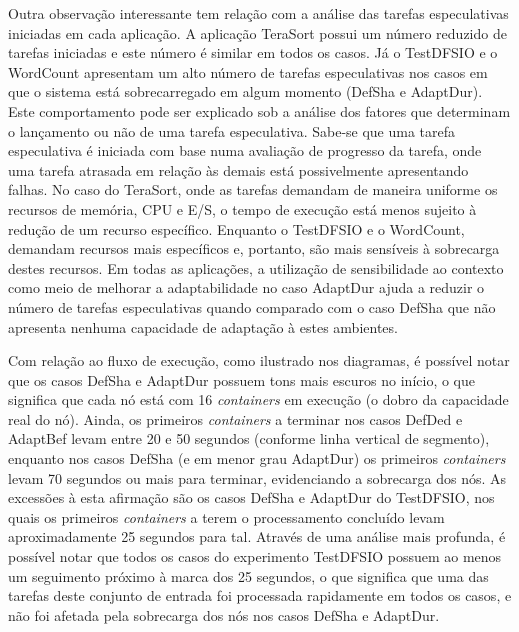 Outra observação interessante tem relação com a análise das tarefas especulativas iniciadas em cada aplicação. A aplicação TeraSort possui um número reduzido de tarefas iniciadas e este número é similar em todos os casos. Já o TestDFSIO e o WordCount apresentam um alto número de tarefas especulativas nos casos em que o sistema está sobrecarregado em algum momento (DefSha e AdaptDur). Este comportamento pode ser explicado sob a análise dos fatores que determinam o lançamento ou não de uma tarefa especulativa. Sabe-se que uma tarefa especulativa é iniciada com base numa avaliação de progresso da tarefa, onde uma tarefa atrasada em relação às demais está possivelmente apresentando falhas. No caso do TeraSort, onde as tarefas demandam de maneira uniforme os recursos de memória, CPU e E/S, o tempo de execução está menos sujeito à redução de um recurso específico. Enquanto o TestDFSIO e o WordCount, demandam recursos mais específicos e, portanto, são mais sensíveis à sobrecarga destes recursos. Em todas as aplicações, a utilização de sensibilidade ao contexto como meio de melhorar a adaptabilidade no caso AdaptDur ajuda a reduzir o número de tarefas especulativas quando comparado com o caso DefSha que não apresenta nenhuma capacidade de adaptação à estes ambientes.

Com relação ao fluxo de execução, como ilustrado nos diagramas, é possível notar que os casos DefSha e AdaptDur possuem tons mais escuros no início, o que significa que cada nó está com 16 \textit{containers} em execução (o dobro da capacidade real do nó). Ainda, os primeiros \textit{containers} a terminar nos casos DefDed e AdaptBef levam entre 20 e 50 segundos (conforme linha vertical de segmento), enquanto nos casos DefSha (e em menor grau AdaptDur) os primeiros \textit{containers} levam 70 segundos ou mais para terminar, evidenciando a sobrecarga dos nós. As excessões à esta afirmação são os casos DefSha e AdaptDur do TestDFSIO, nos quais os primeiros \textit{containers} a terem o processamento concluído levam aproximadamente 25 segundos para tal. Através de uma análise mais profunda, é possível notar que todos os casos do experimento TestDFSIO possuem ao menos um seguimento próximo à marca dos 25 segundos, o que significa que uma das tarefas deste conjunto de entrada foi processada rapidamente em todos os casos, e não foi afetada pela sobrecarga dos nós nos casos DefSha e AdaptDur.

